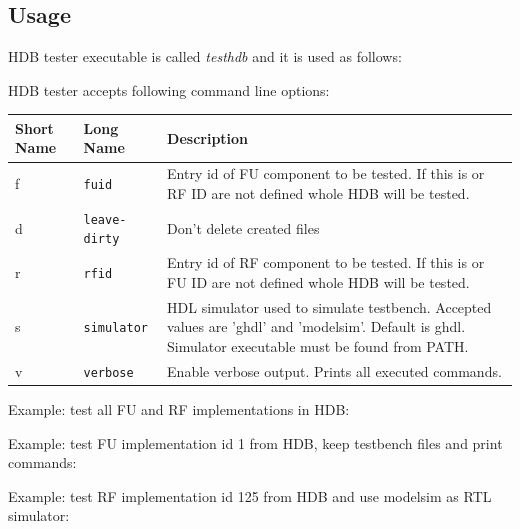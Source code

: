 \documentclass[a4paper,twoside]{tceusermanual}
\begin{document}
\subsection{Usage}

HDB tester executable is called \textit{testhdb} and it is used as follows:


HDB tester accepts following command line options:

\begin{center}
\begin{tabular}[htb]{@{}p{}@{}p{}%
                     @{}p{}}

\textbf{Short Name} &\textbf{Long Name} &\textbf{Description} \\
\hline

f & \verb|fuid| &
Entry id of FU component to be tested. If this is or RF ID are not defined
whole HDB will be tested. \\

d & \verb|leave-dirty| &
Don't delete created files \\

r & \verb|rfid| &
Entry id of RF component to be tested. If this is or FU ID are not defined
whole HDB will be tested. \\

s & \verb|simulator| &
HDL simulator used to simulate testbench. Accepted values are 'ghdl' and
'modelsim'. Default is ghdl. Simulator executable must be found from PATH. \\

v & \verb|verbose| &
Enable verbose output. Prints all executed commands. \\

\end{tabular}
\end{center}

Example: test all FU and RF implementations in HDB:


Example: test FU implementation id 1 from HDB, keep testbench files and print
commands:


Example: test RF implementation id 125 from HDB and use modelsim as RTL
simulator:

\end{document}
